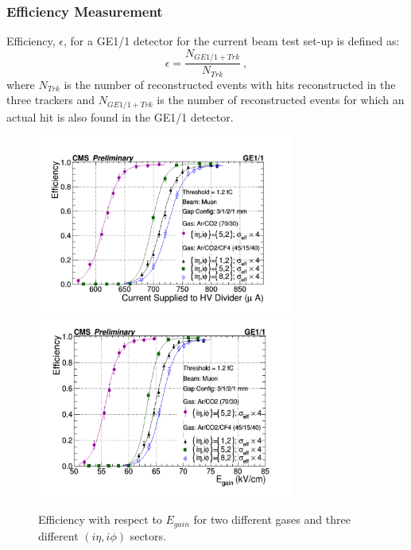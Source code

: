 \subsubsection{Efficiency Measurement}
Efficiency, $\epsilon$, for a GE1/1 detector for the current beam test set-up is defined as:
\begin{equation}
\epsilon = \frac{N_{GE1/1+Trk}}{N_{Trk}}~,
\end{equation}
where $N_{Trk}$ is the number of reconstructed events with hits reconstructed in the three trackers
and $N_{GE1/1+Trk}$ is the number of reconstructed events for which an actual hit is also found in the GE1/1 detector.
\begin{figure}[!htbp]
\centering
\includegraphics[width=0.75\textwidth]{figures/GEM/Efficiency_Current.pdf}\\
\includegraphics[width=0.75\textwidth]{figures/GEM/Efficiency_EGain.pdf}
\caption{Efficiency with respect to $E_{gain}$ for two different gases and three different $(i\eta,i\phi)$ sectors.}
\label{fig:Efficiency_ch}
\end{figure}
